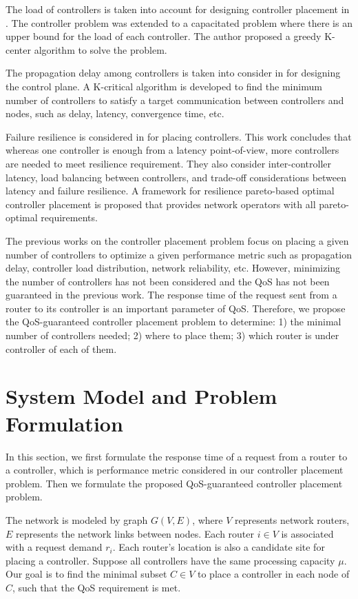 \documentclass[conference]{IEEEtran}
\begin{document}
The load of controllers is taken into account for designing controller placement in \cite{yao2014capacitated}. The controller problem was extended to a capacitated problem where there is an upper bound for the load of each controller. The author proposed a greedy K-center algorithm to solve the problem.

The propagation delay among controllers is taken into consider in \cite{jimenez2014controller} for designing the control plane. A K-critical algorithm is developed to find the minimum number of controllers to satisfy a target communication between controllers and nodes, such as delay, latency, convergence time, etc.

Failure resilience is considered in \cite{hock2013pareto} for placing controllers. This work concludes that whereas one controller is enough from a latency point-of-view, more controllers are needed to meet resilience requirement. They also consider inter-controller latency, load balancing between controllers, and trade-off considerations between latency and failure resilience. A framework for resilience pareto-based optimal controller placement is proposed that provides network operators with all pareto-optimal requirements. 

The previous works on the controller placement problem focus on placing a given number of controllers to optimize a given performance metric such as propagation delay, controller load distribution, network reliability, etc. However, minimizing the number of controllers has not been considered and the QoS has not been guaranteed in the previous work. The response time of the request sent from a router to its controller is an important parameter of QoS. Therefore, we propose the QoS-guaranteed controller placement problem to determine: 1) the minimal number of controllers needed; 2) where to place them; 3) which router is under controller of each of them.     
 

\section{System Model and Problem Formulation}
\label{sec:model}

In this section, we first formulate the response time of a request from a router to a controller, which is performance metric considered in our controller placement problem. Then we formulate the proposed QoS-guaranteed controller placement problem.

The network is modeled by graph $G(V, E)$, where $V$ represents network routers, $E$ represents the network links between nodes. Each router $i\in V$ is associated with a request demand $r_i$. Each router's location is also a candidate site for placing a controller. Suppose all controllers have the same processing capacity $\mu$. Our goal is to find the minimal subset $C\in V$ to place a controller in each node of $C$, such that the QoS requirement is met.    
\end{document}
